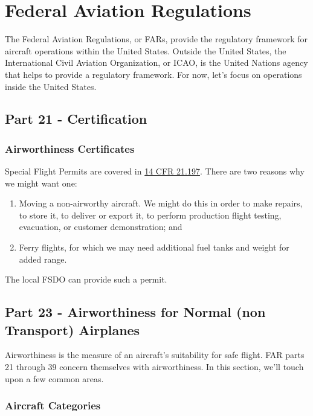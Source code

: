 \chapter{Federal Aviation Regulations}

The Federal Aviation Regulations, or FARs, provide the regulatory framework for aircraft operations within the United States. Outside the United States, the International Civil Aviation Organization, or ICAO, is the United Nations agency that helps to provide a regulatory framework. For now, let's focus on operations inside the United States.

\section{Part 21 - Certification}

\subsection{Airworthiness Certificates}

Special Flight Permits are covered in \href{https://www.ecfr.gov/current/title-14/section-21.197}{14 CFR 21.197}. There are two reasons why we might want one:

\begin{enumerate}
\item Moving a non-airworthy aircraft. We might do this in order to make repairs, to store it, to deliver or export it, to perform production flight testing, evacuation, or customer demonstration; and
\item Ferry flights, for which we may need additional fuel tanks and weight for added range.
\end{enumerate}

The local FSDO can provide such a permit.

\section{Part 23 - Airworthiness for Normal (non Transport) Airplanes}

Airworthiness is the measure of an aircraft's suitability for safe flight. FAR parts 21 through 39 concern themselves with airworthiness. In this section, we'll touch upon a few common areas.

\subsection{Aircraft Categories}

